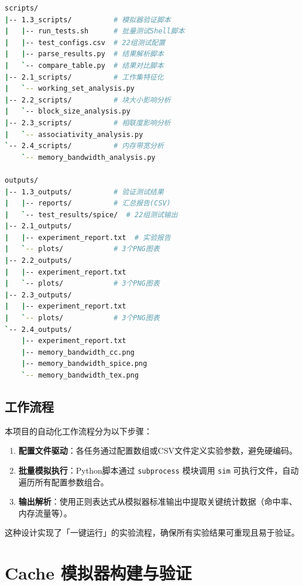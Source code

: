 \documentclass[12pt,a4paper]{article}
\begin{document}
\begin{lstlisting}[language=bash]
scripts/
|-- 1.3_scripts/          # 模拟器验证脚本
|   |-- run_tests.sh      # 批量测试Shell脚本
|   |-- test_configs.csv  # 22组测试配置
|   |-- parse_results.py  # 结果解析脚本
|   `-- compare_table.py  # 结果对比脚本
|-- 2.1_scripts/          # 工作集特征化
|   `-- working_set_analysis.py
|-- 2.2_scripts/          # 块大小影响分析
|   `-- block_size_analysis.py
|-- 2.3_scripts/          # 相联度影响分析
|   `-- associativity_analysis.py
`-- 2.4_scripts/          # 内存带宽分析
    `-- memory_bandwidth_analysis.py

outputs/
|-- 1.3_outputs/          # 验证测试结果
|   |-- reports/          # 汇总报告(CSV)
|   `-- test_results/spice/  # 22组测试输出
|-- 2.1_outputs/
|   |-- experiment_report.txt  # 实验报告
|   `-- plots/            # 3个PNG图表
|-- 2.2_outputs/
|   |-- experiment_report.txt
|   `-- plots/            # 3个PNG图表
|-- 2.3_outputs/
|   |-- experiment_report.txt
|   `-- plots/            # 3个PNG图表
`-- 2.4_outputs/
    |-- experiment_report.txt
    |-- memory_bandwidth_cc.png
    |-- memory_bandwidth_spice.png
    `-- memory_bandwidth_tex.png
\end{lstlisting}

\subsection{工作流程}

本项目的自动化工作流程分为以下步骤：

\begin{enumerate}
    \item \textbf{配置文件驱动}：各任务通过配置数组或CSV文件定义实验参数，避免硬编码。
    
    \item \textbf{批量模拟执行}：Python脚本通过 \texttt{subprocess} 模块调用 \texttt{sim} 可执行文件，自动遍历所有配置参数组合。
    
    \item \textbf{输出解析}：使用正则表达式从模拟器标准输出中提取关键统计数据（命中率、内存流量等）。
    
\end{enumerate}

这种设计实现了「一键运行」的实验流程，确保所有实验结果可重现且易于验证。

\clearpage
\section{Cache 模拟器构建与验证}
\end{document}
